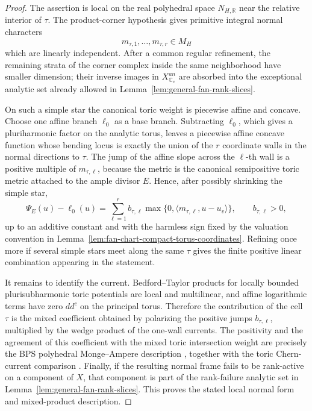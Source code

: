 \documentclass[10pt,a4paper]{amsart}
\theoremstyle{plain}
\theoremstyle{plain}
\numberwithin{equation}{section}
\begin{document}
\begin{proof}
	The assertion is local on the real polyhedral space \(N_{H,\mathbb R}\) near
	the relative interior of \(\tau\).  The product-corner hypothesis gives
	primitive integral normal characters
	\[
	m_{\tau,1},\ldots,m_{\tau,r}\in M_H
	\]
	which are linearly independent.  After a common regular refinement, the remaining strata of the corner complex
	inside the same neighborhood have smaller dimension; their inverse images in
	\(X^{an}_{\mathbb C_v}\) are absorbed into the exceptional analytic set already
	allowed in Lemma~\ref{lem:general-fan-rank-slices}.
	
	On such a simple star the canonical toric weight is piecewise affine and
	concave.  Choose one affine branch \(\ell_0\) as a base branch.  Subtracting
	\(\ell_0\), which gives a pluriharmonic factor on the analytic torus, leaves a
	piecewise affine concave function whose bending locus is exactly the union of
	the \(r\) coordinate walls in the normal directions to \(\tau\).  The jump of
	the affine slope across the \(\ell\)-th wall is a positive multiple of
	\(m_{\tau,\ell}\), because the metric is the canonical semipositive toric
	metric attached to the ample divisor \(E\).  Hence, after possibly shrinking
	the simple star,
	\[
	\Psi_E(u)-\ell_0(u)
	=
	\sum_{\ell=1}^{r} b_{\tau,\ell}
	\max\{0,\langle m_{\tau,\ell},u-u_v\rangle\},
	\qquad b_{\tau,\ell}>0,
	\]
	up to an additive constant and with the harmless sign fixed by the valuation
	convention in Lemma~\ref{lem:fan-chart-compact-torus-coordinates}.  Refining
	once more if several simple stars meet along the same \(\tau\) gives the
	finite positive linear combination appearing in the statement.
	
	It remains to identify the current.  Bedford--Taylor products for locally
	bounded plurisubharmonic toric potentials are local and multilinear, and
	affine logarithmic terms have zero \(dd^c\) on the principal torus.  Therefore
	the contribution of the cell \(\tau\) is the mixed coefficient obtained by
	polarizing the positive jumps \(b_{\tau,\ell}\), multiplied by the wedge
	product of the one-wall currents.  The positivity and the agreement of this
	coefficient with the mixed toric intersection weight are precisely the BPS
	polyhedral Monge--Ampere description
	\cite[Proposition~2.7.4, Definition~2.7.12 and Proposition~2.7.13]{BPS14},
	together with the toric Chern-current comparison
	\cite[Theorem~4.8.11 and Corollary~4.8.12]{BPS14}.  Finally, if the resulting
	normal frame fails to be rank-active on a component of \(X\), that component is
	part of the rank-failure analytic set in
	Lemma~\ref{lem:general-fan-rank-slices}.  This proves the stated local normal
	form and mixed-product description.
\end{proof}
\end{document}
